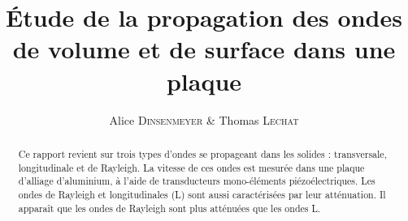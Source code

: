 \documentclass[twoside]{article}
\title{\vspace{-15mm}\fontsize{24pt}{10pt}\selectfont\textbf{Étude de la propagation des ondes de volume et de surface dans une plaque}} %
\author{
\large
{Alice \textsc{Dinsenmeyer} \& Thomas \textsc{Lechat}}\\[2mm] %
\vspace{-5mm}
}
\date{}
\begin{document}
\maketitle %

\thispagestyle{fancy} %


\begin{abstract}

\noindent Ce rapport revient sur trois types d'ondes se propageant dans les solides : transversale, longitudinale et de Rayleigh. La vitesse de ces ondes est mesurée dans une plaque d'alliage d'aluminium, à l'aide de transducteurs mono-éléments piézoélectriques. Les ondes de Rayleigh et longitudinales (L) sont aussi caractérisées par leur atténuation. Il apparaît que les ondes de Rayleigh sont plus atténuées que les ondes L.

\end{abstract}

\end{document}
